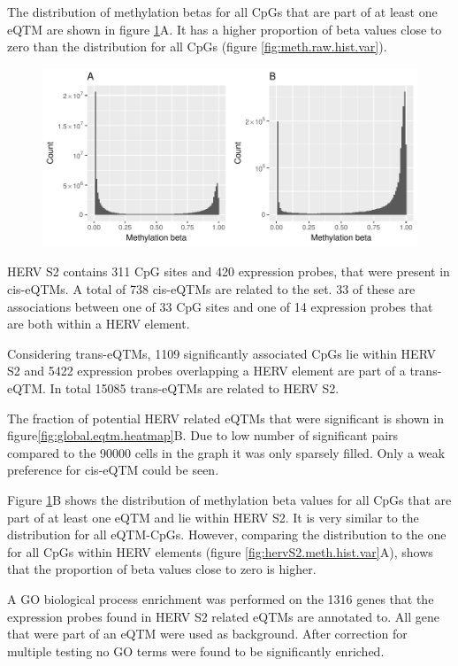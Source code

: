 \documentclass[a4paper,12pt,twoside,openright]{article}
\begin{document}
The distribution of methylation betas for all CpGs that are part of at least one eQTM are shown in figure \ref{fig:eqtm.meth.hist}A. It has a higher proportion of beta values close to zero than the distribution for all CpGs (figure \ref{fig:meth.raw.hist.var}). 

\begin{figure}[tb]
	\includegraphics[scale = 1, keepaspectratio = true]{../figures/eqtm_meth_hist}  
	\caption{}
    \label{fig:eqtm.meth.hist}
\end{figure}

HERV S2 contains 311 CpG sites and 420 expression probes, that were present in cis-eQTMs. A total of 738 cis-eQTMs are related to the set. 33 of these are associations between one of 33 CpG sites and one of 14 expression probes that are both  within a HERV element. 

Considering trans-eQTMs, 1109 significantly associated CpGs lie within HERV S2 and 5422 expression probes overlapping a HERV element are part of a trans-eQTM. In total 15085 trans-eQTMs are related to HERV S2.

The fraction of potential HERV related eQTMs that were significant is shown in figure\ref{fig:global.eqtm.heatmap}B. Due to low number of significant pairs compared to the 90000 cells in the graph it was only sparsely filled. Only a weak preference for cis-eQTM could be seen. 

Figure \ref{fig:eqtm.meth.hist}B shows the distribution of methylation beta values for all CpGs that are part of at least one eQTM and lie within HERV S2. It is very similar to the distribution for all eQTM-CpGs. However, comparing the distribution to the one for all CpGs within HERV elements (figure \ref{fig:hervS2.meth.hist.var}A), shows that the proportion of beta values close to zero is higher.  

A GO biological process enrichment was performed on the 1316 genes that the expression probes found in HERV S2 related eQTMs are annotated to. All gene that were part of an eQTM were used as background. After correction for multiple testing no GO terms were found to be significantly enriched. 
\end{document}
